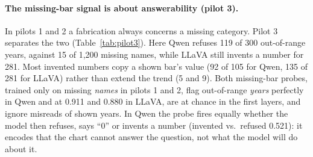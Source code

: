 

\paragraph{The missing-bar signal is about answerability (pilot 3).} In pilots 1
and 2 a fabrication always concerns a missing category. Pilot 3 separates the two
(Table~\ref{tab:pilot3}). Here Qwen refuses 119 of 300 out-of-range years, against
15 of 1,200 missing names, while LLaVA still invents a number for 281. Most
invented numbers copy a shown bar's value (92 of 105 for Qwen, 135 of 281 for
LLaVA) rather than extend the trend (5 and 9). Both missing-bar probes, trained
only on missing \emph{names} in pilots 1 and 2, flag out-of-range \emph{years}
perfectly in Qwen and at 0.911 and 0.880 in LLaVA, are at chance in the first
layers, and ignore misreads of shown years. In Qwen the probe fires equally
whether the model then refuses, says ``0'' or invents a number (invented vs.\
refused 0.521): it encodes that the chart cannot answer the question, not what
the model will do about it.
